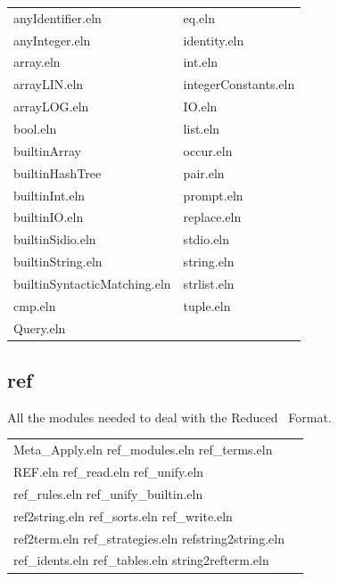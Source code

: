\begin{tabular}{l@{~~~~~}l}
        anyIdentifier.eln            &  eq.eln\\
        anyInteger.eln               &  identity.eln\\
        array.eln                    &  int.eln\\
        arrayLIN.eln                 &  integerConstants.eln\\
        arrayLOG.eln                 &  IO.eln\\
        bool.eln                     &  list.eln\\
        builtinArray                 &  occur.eln\\
        builtinHashTree              &  pair.eln\\
        builtinInt.eln               &  prompt.eln\\
        builtinIO.eln                &  replace.eln\\
        builtinSidio.eln             &  stdio.eln\\
        builtinString.eln            &  string.eln\\
        builtinSyntacticMatching.eln &  strlist.eln\\
        cmp.eln                   &  tuple.eln\\
        Query.eln\\
\end{tabular}

\subsection{ref}

All the modules needed to deal with the Reduced \elan\ Format.

\begin{tabular}{l@{~~~~~}l}
        Meta\_Apply.eln         ref\_modules.eln        ref\_terms.eln \\
        REF.eln                ref\_read.eln           ref\_unify.eln \\
        ref\_rules.eln          ref\_unify\_builtin.eln \\
        ref2string.eln         ref\_sorts.eln          ref\_write.eln \\
        ref2term.eln           ref\_strategies.eln     refstring2string.eln \\
        ref\_idents.eln         ref\_tables.eln         string2refterm.eln
\end{tabular}

